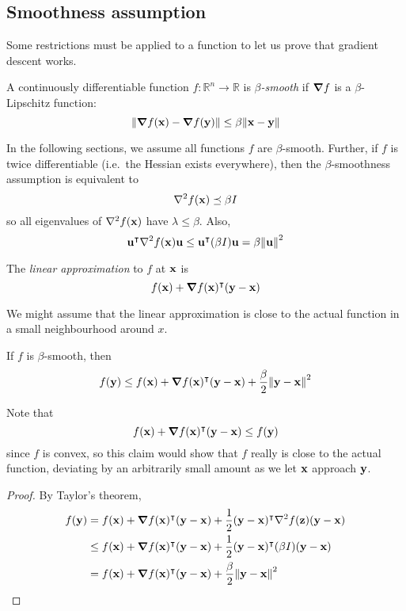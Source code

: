 \subsection{Smoothness assumption}
Some restrictions must be applied to a function to let us prove that gradient descent works.
\begin{definition}
	A continuously differentiable function \(f \colon \mathbb R^n \to \mathbb R\) is \textit{\(\beta\)-smooth} if \(\grad{f}\) is a \(\beta\)-Lipschitz function:
	\[
		\norm{\grad{f(\vb x) - \grad{f(\vb y)}}} \leq \beta \norm{\vb x - \vb y}
	\]
\end{definition}
\noindent In the following sections, we assume all functions \(f\) are \(\beta\)-smooth.
Further, if \(f\) is twice differentiable (i.e.\ the Hessian exists everywhere), then the \(\beta\)-smoothness assumption is equivalent to
\[
	\laplacian{f(\vb x)} \preceq \beta I
\]
so all eigenvalues of \(\laplacian{f(\vb x)}\) have \(\lambda \leq \beta\).
Also,
\[
	\vb u^\transpose \laplacian{f(\vb x)} \vb u \leq \vb u^\transpose (\beta I) \vb u = \beta \norm{\vb u}^2
\]
\begin{definition}
	The \textit{linear approximation} to \(f\) at \(\vb x\) is
	\[
		f(\vb x) + \grad{f(\vb x)}^\intercal (\vb y - \vb x)
	\]
\end{definition}
\noindent We might assume that the linear approximation is close to the actual function in a small neighbourhood around \(x\).
\begin{claim}
	If \(f\) is \(\beta\)-smooth, then
	\[
		f(\vb y) \leq f(\vb x) + \grad{f(\vb x)}^\intercal (\vb y - \vb x) + \frac{\beta}{2}\norm{\vb y - \vb x}^2
	\]
\end{claim}
\noindent Note that
\[
	f(\vb x) + \grad{f(\vb x)}^\intercal (\vb y - \vb x) \leq f(\vb y)
\]
since \(f\) is convex, so this claim would show that \(f\) really is close to the actual function, deviating by an arbitrarily small amount as we let \(\vb x\) approach \(\vb y\).
\begin{proof}
	By Taylor's theorem,
	\begin{align*}
		f(\vb y) & = f(\vb x) + \grad{f(\vb x)}^\transpose (\vb y - \vb x) + \frac{1}{2}(\vb y - \vb x)^\transpose \laplacian{f(\vb z)}(\vb y - \vb x) \\
		         & \leq f(\vb x) + \grad{f(\vb x)}^\transpose (\vb y - \vb x) + \frac{1}{2}(\vb y - \vb x)^\transpose (\beta I) (\vb y - \vb x)        \\
		         & = f(\vb x) + \grad{f(\vb x)}^\transpose (\vb y - \vb x) + \frac{\beta}{2}\norm{\vb y - \vb x}^2                                     \\
	\end{align*}
\end{proof}

